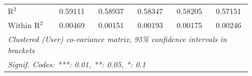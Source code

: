 \begin{table}[htbp]
\begin{threeparttable}[b]
\begin{tabular}{lccccc}
         R$^2$              & 0.59111         & 0.58937         & 0.58347        & 0.58205        & 0.57151\\  
         Within R$^2$       & 0.00469         & 0.00151         & 0.00193        & 0.00175        & 0.00246\\  
         \midrule \midrule
         \multicolumn{6}{l}{\emph{Clustered (User) co-variance matrix, 95\% confidence intervals in brackets}}\\
         \multicolumn{6}{l}{\emph{Signif. Codes: ***: 0.01, **: 0.05, *: 0.1}}\\
      \end{tabular}
   \end{threeparttable}
\end{table}



